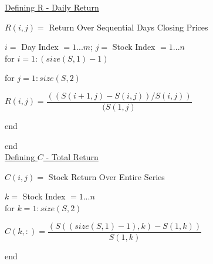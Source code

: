 
\underline {Defining R - Daily Return}

\noindent $R(i,j) =$ Return Over Sequential Days Closing Prices 

\noindent $i = $ Day Index $= 1 ... m$; \indent $j =$ Stock Index $= 1 ... n$ \\[0.35cm]
\noindent for $i = 1:(size(S,1)-1)$

    for $j = 1:size(S,2)$

        \indent \indent $R(i,j) = \dfrac{((S(i+1,j) - S(i,j))/S(i,j))}{(S(1,j)}$

    end

\noindent end\\[0.5cm]


\noindent\underline{Defining $C$ - Total Return}

\noindent $C(i,j) =$ Stock Return Over Entire Series 

\noindent $k =$ Stock Index $= 1 ... n$ \\[0.35cm]
\noindent for $k = 1:size(S,2)$

   \indent $C(k,:) = \dfrac{(S((size(S,1)-1),k)-S(1,k))}{S(1,k)}$

\noindent end
